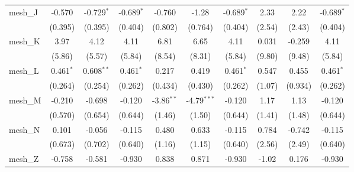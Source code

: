 \begin{tabular}{lccccccccc}
   mesh\_J                                                     & -0.570         & -0.729$^{*}$   & -0.689$^{*}$  & -0.760         & -1.28          & -0.689$^{*}$  & 2.33         & 2.22        & -0.689$^{*}$\\   
                                                               & (0.395)        & (0.395)        & (0.404)       & (0.802)        & (0.764)        & (0.404)       & (2.54)       & (2.43)      & (0.404)\\   
   mesh\_K                                                     & 3.97           & 4.12           & 4.11          & 6.81           & 6.65           & 4.11          & 0.031        & -0.259      & 4.11\\   
                                                               & (5.86)         & (5.57)         & (5.84)        & (8.54)         & (8.31)         & (5.84)        & (9.80)       & (9.48)      & (5.84)\\   
   mesh\_L                                                     & 0.461$^{*}$    & 0.608$^{**}$   & 0.461$^{*}$   & 0.217          & 0.419          & 0.461$^{*}$   & 0.547        & 0.455       & 0.461$^{*}$\\   
                                                               & (0.264)        & (0.254)        & (0.262)       & (0.434)        & (0.430)        & (0.262)       & (1.07)       & (0.934)     & (0.262)\\   
   mesh\_M                                                     & -0.210         & -0.698         & -0.120        & -3.86$^{**}$   & -4.79$^{***}$  & -0.120        & 1.17         & 1.13        & -0.120\\   
                                                               & (0.570)        & (0.654)        & (0.644)       & (1.46)         & (1.50)         & (0.644)       & (1.41)       & (1.48)      & (0.644)\\   
   mesh\_N                                                     & 0.101          & -0.056         & -0.115        & 0.480          & 0.633          & -0.115        & 0.784        & -0.742      & -0.115\\   
                                                               & (0.673)        & (0.702)        & (0.640)       & (1.16)         & (1.15)         & (0.640)       & (2.56)       & (2.49)      & (0.640)\\   
   mesh\_Z                                                     & -0.758         & -0.581         & -0.930        & 0.838          & 0.871          & -0.930        & -1.02        & 0.176       & -0.930\\   

\end{tabular}
